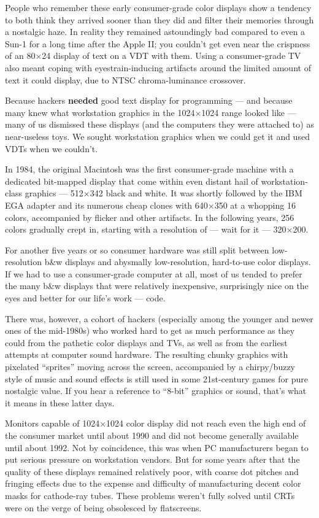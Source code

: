 \documentclass[10pt]{article}
\newcommand{\strong}[1]{\textbf{#1}}
\newcommand{\mc}{\small}
\newcommand{\acro}[1]{{\mc #1\spacefactor1000}}
\begin{document}
People who remember these early consumer-grade color displays show a tendency
to both think they arrived sooner than they did and filter their memories
through a nostalgic haze. In reality they remained astoundingly bad compared to
even a Sun-1 for a long time after the Apple II; you couldn't get even near the
crispness of an 80$\times$24 display of text on a \acro{VDT} with them. Using a
consumer-grade TV also meant coping with eyestrain-inducing artifacts around
the limited amount of text it could display, due to \acro{NTSC} chroma-luminance
crossover.

Because hackers \strong{needed} good text display for programming --- and because many
knew what workstation graphics in the 1024$\times$1024 range looked like --- many of us
dismissed these displays (and the computers they were attached to) as
near-useless toys. We sought workstation graphics when we could get it and used
\acro{VDT}s when we couldn't.

In 1984, the original Macintosh was the first consumer-grade machine with a
dedicated bit-mapped display that come within even distant hail of
workstation-class graphics --- 512$\times$342 black and white. It was shortly followed
by the \acro{IBM EGA} adapter and its numerous cheap clones with 640$\times$350 at a whopping
16 colors, accompanied by flicker and other artifacts. In the following years,
256 colors gradually crept in, starting with a resolution of --- wait for it --- 
320$\times$200.

For another five years or so consumer hardware was still split between
low-resolution b\&w displays and abysmally low-resolution, hard-to-use color
displays. If we had to use a consumer-grade computer at all, most of us tended
to prefer the many b\&w displays that were relatively inexpensive, surprisingly
nice on the eyes and better for our life's work --- code.

There was, however, a cohort of hackers (especially among the younger and newer
ones of the mid-1980s) who worked hard to get as much performance as they could
from the pathetic color displays and \acro{TV}s, as well as from the earliest attempts
at computer sound hardware. The resulting chunky graphics with pixelated
``sprites'' moving across the screen, accompanied by a chirpy/buzzy style of
music and sound effects is still used in some 21st-century games for pure
nostalgic value. If you hear a reference to ``8-bit'' graphics or sound, that's
what it means in these latter days.

Monitors capable of 1024$\times$1024 color display did not reach even the high end of
the consumer market until about 1990 and did not become generally available
until about 1992. Not by coincidence, this was when \acro{PC} manufacturers began to
put serious pressure on workstation vendors. But for some years after that the
quality of these displays remained relatively poor, with coarse dot pitches and
fringing effects due to the expense and difficulty of manufacturing decent
color masks for cathode-ray tubes. These problems weren't fully solved until
\acro{CRT}s were on the verge of being obsolesced by flatscreens.
\end{document}
